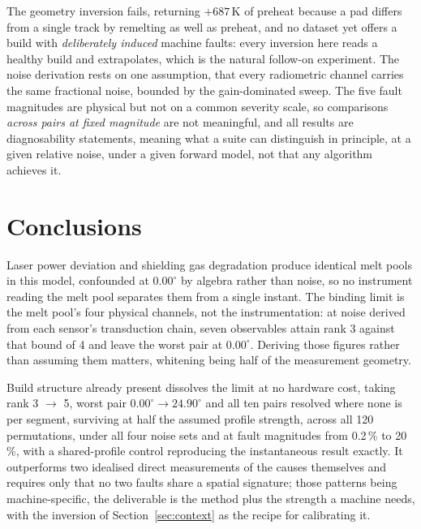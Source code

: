 \documentclass[final,5p,times,twocolumn]{elsarticle}
\begin{document}
The geometry inversion fails, returning $+687$\,K of preheat because a pad
differs from a single track by remelting as well as preheat, and no dataset yet
offers a build with \emph{deliberately induced} machine faults: every inversion
here reads a healthy build and extrapolates, which is the natural follow-on
experiment. The noise derivation rests on one assumption, that every radiometric
channel carries the same fractional noise, bounded by the gain-dominated sweep.
The five fault magnitudes are physical but not on a common severity scale, so
comparisons \emph{across pairs at fixed magnitude} are not meaningful, and all
results are diagnosability statements, meaning what a suite can distinguish in
principle, at a given relative noise, under a given forward model, not that
any algorithm achieves it.

\section{Conclusions}

Laser power deviation and shielding gas degradation produce identical melt pools
in this model, confounded at $0.00^\circ$ by algebra rather than noise, so no
instrument reading the melt pool separates them from a single instant. The
binding limit is the melt pool's four physical channels, not the instrumentation:
at noise derived from each sensor's transduction chain, seven observables attain
rank 3 against that bound of 4 and leave the worst pair at $0.00^\circ$. Deriving
those figures rather than assuming them matters, whitening being half of the
measurement geometry.

Build structure already present dissolves the limit at no hardware cost, taking
rank 3 $\rightarrow$ 5, worst pair $0.00^\circ \rightarrow 24.90^\circ$ and all ten pairs
resolved where none is per segment, surviving at half the assumed profile
strength, across all 120 permutations, under all four noise sets and at fault
magnitudes from 0.2\,\% to 20\,\%, with a shared-profile control reproducing the
instantaneous result exactly. It outperforms two idealised direct measurements of
the causes themselves and requires only that no two faults share a spatial
signature; those patterns being machine-specific, the deliverable is the method
plus the strength a machine needs, with the inversion of
Section~\ref{sec:context} as the recipe for calibrating it.
\end{document}
